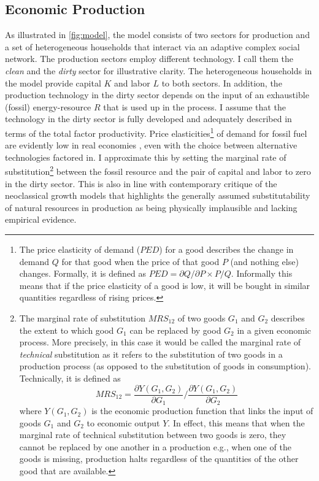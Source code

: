 \subsection{Economic Production}
\label{sec:model_description}

As illustrated in \cref{fig:model}, the model consists of two sectors for production and a set of heterogeneous households that interact via an adaptive complex social network. The production sectors employ different technology. I call them the \textit{clean} and the \textit{dirty} sector for illustrative clarity. The heterogeneous households in the model provide capital $K$ and labor $L$ to both sectors.
In addition, the production technology in the dirty sector depends on the input of an exhaustible (fossil) energy-resource $R$ that is used up in the process. I assume that the technology in the dirty sector is fully developed and adequately described in terms of the total factor productivity. 
Price elasticities\footnote{The price elasticity of demand ($PED$) for a good describes the change in demand $Q$ for that good when the price of that good $P$ (and nothing else) changes. Formally, it is defined as $PED = \partial Q / \partial P \times P/Q$. Informally this means that if the price elasticity of a good is low, it will be bought in similar quantities regardless of rising prices.} of demand for fossil fuel are evidently low in real economies \citep{IMF2011, Hosslinger2017, Labandeira2017}, even with the choice between alternative technologies factored in. I approximate this by setting the marginal rate of substitution\footnote{The marginal rate of substitution $MRS_{12}$ of two goods $G_1$ and $G_2$ describes the extent to which good $G_1$ can be replaced by good $G_2$ in a given economic process. More precisely, in this case it would be called the marginal rate of \emph{technical} substitution as it refers to the substitution of two goods in a production process (as opposed to the substitution of goods in consumption). Technically, it is defined as 
\begin{equation}
  MRS_{12} = \frac{\partial Y(G_1,G_2)}{\partial G_1} / \frac{\partial Y(G_1, G_2)}{\partial G_2} \nonumber
\end{equation}
where $Y(G_1, G_2)$ is the economic production function that links the input of goods $G_1$ and $G_2$ to economic output $Y$. In effect, this means that when the marginal rate of technical substitution between two goods is zero, they cannot be replaced by one another in a production e.g., when one of the goods is missing, production halts regardless of the quantities of the other good that are available.} between the fossil resource and the pair of capital and labor to zero in the dirty sector. This is also in line with contemporary critique of the neoclassical growth models \citep{Daly1997,georgescu1975energy,georgescu1979comments, Ayres2007, Ayres2013} that highlights the generally assumed substitutability of natural resources in production as being physically implausible and lacking empirical evidence.

